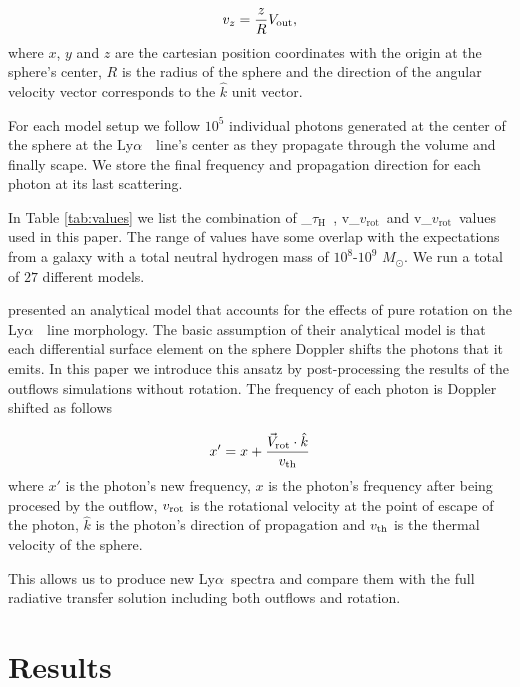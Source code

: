 \documentclass[a4paper,fleqn,usenatbib]{mnras}
\newcommand{\lya}{\ifmmode{{\rm Ly}\alpha}\else Ly$\alpha$\ \fi}
\newcommand{\vrot}{\ifmmode v_{\mathrm{rot}}\else $v_{\mathrm{rot}}$~\fi}
\newcommand{\tauh}{\ifmmode \tau_{\mathrm{H}}\else $\tau_{\mathrm{H}}$~\fi}
\begin{document}
\begin{equation}
	v_{z}=\frac{z}{R}V_{\rm out},
	\label{eq:vz}
\end{equation}
%
where $x$, $y$ and $z$ are the cartesian position coordinates with the
origin at the sphere's center, $R$ is the radius of the sphere and the
direction of the angular velocity vector corresponds to the $\hat{k}$
unit vector.

For each model setup we follow $10^5$ individual photons generated at
the center of the sphere at the \lya\ line's center as they propagate
through the volume and finally scape.
We store the final frequency and propagation direction for each photon
at its last scattering.

In Table \ref{tab:values} we list the combination of \tauh,
\vrot and \vrot values used in this paper.
The range of values have some overlap with the expectations from a
galaxy with a total neutral hydrogen mass of $10^8$-$10^9$
$M_{\odot}$. We run a total of $27$ different models. 


\cite{Garavito14} presented an analytical model that
accounts for the effects of pure rotation on the
\lya\ line morphology. 
The basic assumption of their analytical model is that each
differential surface element on the sphere Doppler shifts the photons
that it emits.
In this paper we introduce this ansatz by post-processing the results
of the outflows simulations without rotation.
The frequency of each photon is Doppler shifted as follows

\begin{equation}
x' = x + \frac{\vec{V}_{\rm rot}\cdot\hat{k}}{v_{\rm th}}
\label{eq:shift_x}
\end{equation}
%
where $x'$ is the photon's new frequency, $x$ is the photon's
frequency after being procesed by the outflow, $v_{\rm rot}$ is the 
rotational velocity at the point of escape of the photon, $\hat{k}$ is
the photon's direction of propagation and $v_{\rm th}$ is the thermal
velocity of the sphere.

This allows us to produce new \lya spectra and compare them with the
full radiative transfer solution including both outflows and
rotation.

\section{Results}
\end{document}
